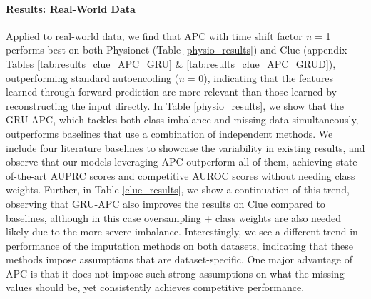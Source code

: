 \documentclass{article}
\begin{document}
\paragraph{Results: Real-World Data}
Applied to real-world data, we find that APC with time shift factor \textit{n} = 1 
performs best on both Physionet (Table \ref{physio_results}) and Clue (appendix Tables \ref{tab:results_clue_APC_GRU} \& \ref{tab:results_clue_APC_GRUD}), outperforming standard autoencoding (\textit{n} = 0),
indicating that the features learned through forward prediction are more relevant than those learned by reconstructing the input directly. 
In Table \ref{physio_results}, we show that the GRU-APC, which tackles both class imbalance and missing data simultaneously, outperforms baselines that use a combination of independent methods.
We include four literature baselines to showcase the variability in existing results, and observe that our models leveraging APC outperform all of them, achieving state-of-the-art AUPRC scores and competitive AUROC scores without needing class weights.
Further, in Table \ref{clue_results}, we show a continuation of this trend, observing that GRU-APC also improves the results on Clue compared to baselines, although in this case oversampling + class weights are also needed likely due to the more severe imbalance.
Interestingly, we see a different trend in performance of the imputation methods on both datasets, 
indicating that these methods impose assumptions that are dataset-specific. 
One major advantage of APC is that it does not impose such strong assumptions on what the missing values should be, yet consistently achieves competitive performance.
\end{document}
